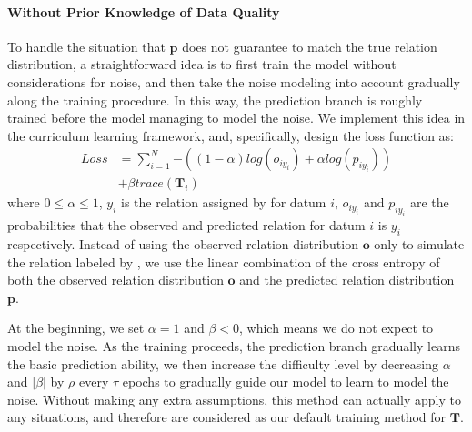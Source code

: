 \paragraph{Without Prior Knowledge of Data Quality}
To handle the situation that $\mathbf{p}$ does not guarantee to match the true relation distribution, a straightforward idea is to first train the model without considerations for noise,  and then take the noise modeling into account gradually along the training procedure. In this way, the prediction branch is roughly trained before the model managing to model the noise. We implement this idea in the curriculum learning framework, and,  specifically,
design the loss function as:
%
%
\begin{equation}
\begin{aligned}
Loss	&=\sum_{i=1}^N{-((1-\alpha) log(o_{iy_{i}}) + \alpha log(p_{iy_{i}}))} \\
&+ \beta trace(\mathbf{T}_{i})
\end{aligned}
\label{general_loss}
\end{equation}
where $0\le\alpha\le1$, $y_i$ is the relation assigned by \DS for datum $i$, $o_{iy_{i}}$ and $p_{iy_{i}}$ are the probabilities that the observed and predicted relation for datum $i$ is $y_i$ respectively. Instead of using the observed relation distribution $\mathbf{o}$ only to simulate the relation labeled by \DS, we use the linear combination of the cross entropy of both the observed relation distribution $\mathbf{o}$ and the predicted relation distribution $\mathbf{p}$. 

At the beginning, we set $\alpha=1$ and $\beta<0$, which means we do not expect to model the noise. As the training proceeds, the prediction branch gradually learns the basic prediction ability, we then increase the difficulty level by decreasing $\alpha$ and  $|\beta|$ by $\rho$ every $\tau$ epochs to gradually guide our model to learn to model the noise. Without making any extra assumptions, this method can actually apply to any situations, and therefore are considered as our default training method for $\mathbf{T}$.

